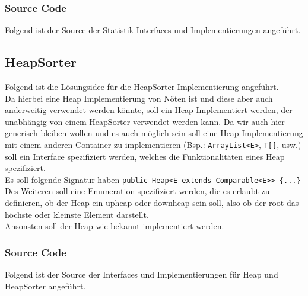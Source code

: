 \documentclass[11pt, a4paper, twoside]{article}   	%
\newcommand{\srcDir}{../src/main/java}
\newcommand{\mainPackage}{\srcDir/at/fhooe/swe4/lab3}
\newcommand{\inlinecode}{\lstinline[style=inlineSource]}
\begin{document}
\subsubsection{Source Code}
Folgend ist der Source der Statistik Interfaces und Implementierungen angeführt.





\newpage
\subsection{HeapSorter}
Folgend ist die Lösungsidee für die HeapSorter Implementierung angeführt.\\
Da hierbei eine Heap Implementierung von Nöten ist und diese aber auch anderweitig verwendet werden könnte, soll ein Heap Implementiert werden, der unabhängig von einem HeapSorter verwendet werden kann. Da wir auch hier generisch bleiben wollen und es auch möglich sein soll eine Heap Implementierung mit einem anderen Container zu implementieren (Bsp.: \inlinecode{ArrayList<E>}, \inlinecode{T[]}, usw.) soll ein Interface spezifiziert werden, welches die Funktionalitäten eines Heap spezifiziert.\\ Es soll folgende Signatur haben
\inlinecode|public Heap<E extends Comparable<E>> {...}|\\
Des Weiteren soll eine Enumeration spezifiziert werden, die es erlaubt zu definieren, ob der Heap ein upheap oder downheap sein soll, also ob der root das höchste oder kleinste Element darstellt.\\
Ansonsten soll der Heap wie bekannt implementiert werden.
\newpage
\subsubsection{Source Code}
Folgend ist der Source der Interfaces und Implementierungen für Heap und HeapSorter angeführt.



\newpage
\end{document}
